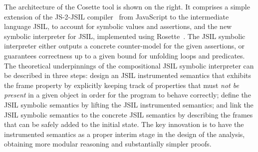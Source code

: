 \documentclass[sigconf, review]{acmart}
\newcommand{\jsil}{JSIL\xspace}
\newcommand{\JSComp}{JS-2-JSIL\xspace}
\newcommand{\cosette}{Cosette\xspace}
\newcommand{\pmaxinline}[1]{ {\color{blue} *** PM : #1 ***} }
\begin{document}
The architecture of the \cosette tool  is shown on the right. It comprises a
simple extension of the \JSComp compiler~\cite{.}  from JavaScript to the
intermediate language JSIL, to account for symbolic values and
assertions, and the new  symbolic interpreter for JSIL, implemented using
Rosette~\cite{Rosette2,Rosette1}.  
The JSIL symbolic interpreter 
either outputs a concrete counter-model for the given assertions, or
guarantees correctness up to a given bound for unfolding loops and
predicates.  %
The theoretical underpinnings of the compositional JSIL symbolic
interpreter can be described in three steps:  design an JSIL
instrumented semantics that exhibits the frame property by explicitly
keeping track of properties that must {\em not be present} in a given
object in order for the program to behave correctly;  define
the JSIL symbolic semantics by lifting the JSIL instrumented
semantics; and  link the JSIL symbolic semantics to the
concrete JSIL semantics by describing the frames that can be safely
added to the initial state.
%
The key innovation is to have the instrumented semantics as a proper
interim stage in the design of the analysis, obtaining more modular
reasoning and substantially simpler proofs.













%
\end{document}
